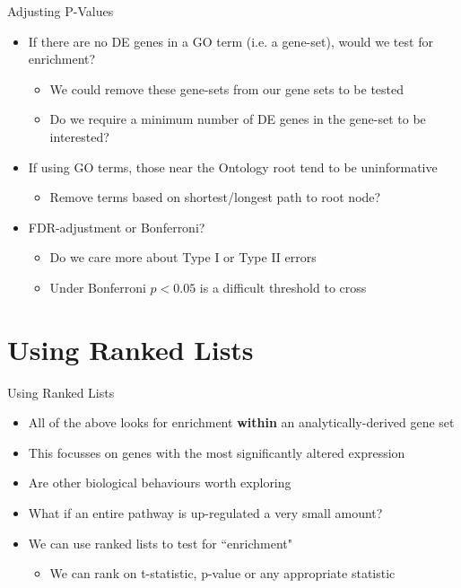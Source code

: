 \documentclass[aspectratio=169,11pt]{beamer}
\begin{document}
\begin{frame}{Adjusting P-Values}

	\begin{itemize}
		\item If there are no DE genes in a GO term (i.e. a gene-set), would we test for enrichment?
		\begin{itemize}
			\item We could remove these gene-sets from our gene sets to be tested
			\item Do we require a minimum number of DE genes in the gene-set to be interested?
		\end{itemize}
		\item If using GO terms, those near the Ontology root tend to be uninformative
		\begin{itemize}
			\item Remove terms based on shortest/longest path to root node?
		\end{itemize}
		\item FDR-adjustment or Bonferroni?
		\begin{itemize}
			\item Do we care more about Type I or Type II errors
			\item Under Bonferroni $p < 0.05$ is a difficult threshold to cross
		\end{itemize}
	\end{itemize}
	
\end{frame}


\section{Using Ranked Lists}

\begin{frame}{Using Ranked Lists}

	\begin{itemize}
		\item All of the above looks for enrichment \textbf{within} an analytically-derived gene set
		\item This focusses on genes with the most significantly altered expression
		\item Are other biological behaviours worth exploring
		\pause
		\item What if an entire pathway is up-regulated a very small amount?
		\item We can use ranked lists to test for ``enrichment"
		\begin{itemize}
			\item We can rank on t-statistic, p-value or any appropriate statistic
		\end{itemize}
	\end{itemize}

\end{frame}
\end{document}
